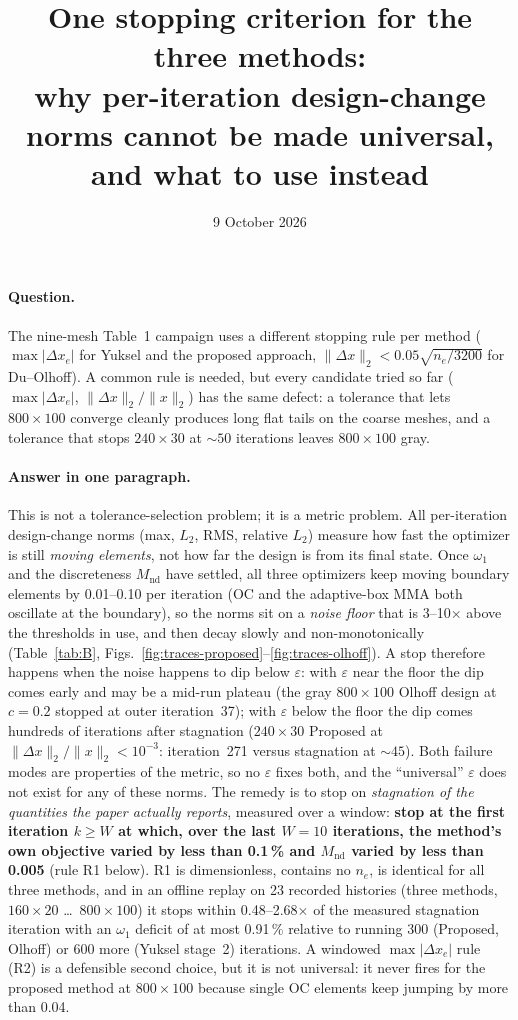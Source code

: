 \documentclass[11pt,a4paper]{article}
\title{One stopping criterion for the three methods:\\[0.3em]
  \large why per-iteration design-change norms cannot be made universal,\\
  and what to use instead}
\author{}
\date{9 October 2026}
\newcommand{\Mnd}{M_{\mathrm{nd}}}
\newcommand{\dx}{\Delta x}
\newcommand{\maxdx}{\max|\Delta x_e|}
\newcommand{\relL}{\|\Delta x\|_2/\|x\|_2}
\newcommand{\me}[2]{$#1\times#2$}
\begin{document}
\maketitle

\paragraph{Question.}
The nine-mesh Table~1 campaign uses a different stopping rule per method
($\maxdx$ for Yuksel and the proposed approach,
$\|\dx\|_2 < 0.05\sqrt{n_e/3200}$ for Du--Olhoff). A common rule is needed, but
every candidate tried so far ($\maxdx$, $\relL$) has the same defect: a tolerance
that lets \me{800}{100} converge cleanly produces long flat tails on the coarse
meshes, and a tolerance that stops \me{240}{30} at ${\sim}50$ iterations leaves
\me{800}{100} gray.

\paragraph{Answer in one paragraph.}
This is not a tolerance-selection problem; it is a metric problem. All
per-iteration design-change norms (max, $L_2$, RMS, relative $L_2$) measure how
fast the optimizer is still \emph{moving elements}, not how far the design is
from its final state. Once $\omega_1$ and the discreteness $\Mnd$ have settled,
all three optimizers keep moving boundary elements by 0.01--0.10 per iteration
(OC and the adaptive-box MMA both oscillate at the boundary), so the norms sit
on a \emph{noise floor} that is 3--10$\times$ above the thresholds in use, and
then decay slowly and non-monotonically (Table~\ref{tab:B},
Figs.~\ref{fig:traces-proposed}--\ref{fig:traces-olhoff}). A stop therefore
happens when the noise happens to dip below $\varepsilon$: with $\varepsilon$
near the floor the dip comes early and may be a mid-run plateau (the gray
\me{800}{100} Olhoff design at $c = 0.2$ stopped at outer iteration~37); with
$\varepsilon$ below the floor the dip comes hundreds of iterations after
stagnation (\me{240}{30} Proposed at $\relL < 10^{-3}$: iteration~271 versus
stagnation at ${\sim}45$). Both failure modes are properties of the metric, so
no $\varepsilon$ fixes both, and the ``universal'' $\varepsilon$ does not exist
for any of these norms. The remedy is to stop on \emph{stagnation of the
quantities the paper actually reports}, measured over a window:
\textbf{stop at the first iteration $k \ge W$ at which, over the last $W = 10$
iterations, the method's own objective varied by less than 0.1\,\% and $\Mnd$
varied by less than 0.005} (rule R1 below). R1 is dimensionless, contains no
$n_e$, is identical for all three methods, and in an offline replay on 23
recorded histories (three methods, \me{160}{20} \ldots\ \me{800}{100}) it stops
within 0.48--2.68$\times$ of the measured stagnation iteration with an $\omega_1$
deficit of at most 0.91\,\% relative to running 300 (Proposed, Olhoff) or 600
more (Yuksel stage~2) iterations. A windowed $\maxdx$ rule (R2) is a defensible
second choice, but it is not universal: it never fires for the proposed method
at \me{800}{100} because single OC elements keep jumping by more than 0.04.
\end{document}
